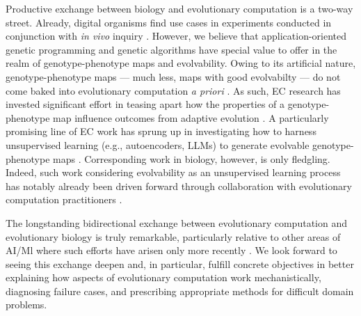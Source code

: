 Productive exchange between biology and evolutionary computation is a two-way street.
Already, digital organisms find use cases in experiments conducted in conjunction with \textit{in vivo} inquiry \citep{TODO}.
However, we believe that application-oriented genetic programming and genetic algorithms have special value to offer in the realm of genotype-phenotype maps and evolvability.
Owing to its artificial nature, genotype-phenotype maps --- much less, maps with good evolvabilty --- do not come baked into evolutionary computation \textit{a priori} \citep{kirschner1998evolvability}.
As such, EC research has invested significant effort in teasing apart how the properties of a genotype-phenotype map influence outcomes from adaptive evolution \citep{TODO}.
A particularly promising line of EC work has sprung up in investigating how to harness unsupervised learning (e.g., autoencoders, LLMs) to generate evolvable genotype-phenotype maps \citep{moreno2018understanding,bradley2024openelm,wittenberg2023denoising,MORECITES}.
Corresponding work in biology, however, is only fledgling.
Indeed, such work considering evolvability as an unsupervised learning process has notably already been driven forward through collaboration with evolutionary computation practitioners \citep{kouvaris2017evolution,szilagyi2020phenotypes}.

The longstanding bidirectional exchange between evolutionary computation and evolutionary biology is truly remarkable, particularly relative to other areas of AI/Ml where such efforts have arisen only more recently \citep{marblestone2016toward,richards2019deep}.
We look forward to seeing this exchange deepen and, in particular, fulfill concrete objectives in better explaining how aspects of evolutionary computation work mechanistically, diagnosing failure cases, and prescribing appropriate methods for difficult domain problems.

